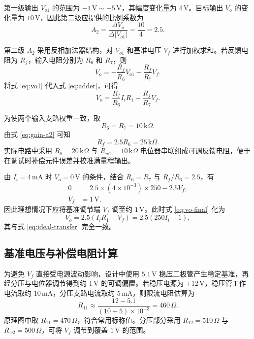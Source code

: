\documentclass[UTF8,a4paper,zihao=-4]{ctexart}
\begin{document}
第一级输出 $V_{o1}$ 的范围为 $-1\,\mathrm{V}\sim-5\,\mathrm{V}$，其幅度变化量为 $4\,\mathrm{V}$。目标输出 $V_o$ 的变化量为 $10\,\mathrm{V}$，因此第二级应提供的比例系数为
\begin{equation}
  A_2=\frac{\Delta V_o}{\Delta |V_{o1}|}
  =\frac{10}{4}=2.5 .
  \label{eq:gain-a2}
\end{equation}

第二级 $A_2$ 采用反相加法器结构，对 $V_{o1}$ 和基准电压 $V_f$ 进行加权求和。若反馈电阻为 $R_f$，输入电阻分别为 $R_6$ 和 $R_7$，则
\begin{equation}
  V_o=-\frac{R_f}{R_6}V_{o1}-\frac{R_f}{R_7}V_f .
  \label{eq:adder}
\end{equation}
将式 \eqref{eq:vo1} 代入式 \eqref{eq:adder}，可得
\begin{equation}
  V_o=\frac{R_f}{R_6}I_iR_1-\frac{R_f}{R_7}V_f .
  \label{eq:vo-final}
\end{equation}

为使两个输入支路权重一致，取
\begin{equation}
  R_6=R_7=10\,\mathrm{k}\Omega .
\end{equation}
由式 \eqref{eq:gain-a2} 可知
\begin{equation}
  R_f = 2.5R_6 = 25\,\mathrm{k}\Omega .
  \label{eq:rf}
\end{equation}
实际电路中采用 $R_8=20\,\mathrm{k}\Omega$ 与 $R_{w1}=10\,\mathrm{k}\Omega$ 电位器串联组成可调反馈电阻，便于在调试时补偿元件误差并校准满量程输出。

由 $I_i=4\,\mathrm{mA}$ 时 $V_o=0\,\mathrm{V}$ 的条件，结合 $R_6=R_7$ 与 $R_f/R_6=2.5$，有
\begin{align}
  0 &= 2.5 \times (4\times10^{-3}) \times 250 - 2.5 V_f,\\
  V_f &= 1\,\mathrm{V}.
  \label{eq:vf}
\end{align}
因此理想情况下应将基准调节端 $V_f$ 调至约 $1\,\mathrm{V}$。此时式 \eqref{eq:vo-final} 化为
\begin{equation}
  V_o=2.5\left(I_iR_1 - V_f\right)
  =2.5\left(250 I_i-1\right),
  \label{eq:transfer-designed}
\end{equation}
其与式 \eqref{eq:ideal-transfer} 完全一致。

\subsection{基准电压与补偿电阻计算}

为避免 $V_f$ 直接受电源波动影响，设计中使用 $5.1\,\mathrm{V}$ 稳压二极管产生稳定基准，再经分压与电位器调节得到约 $1\,\mathrm{V}$ 的可调偏置。若稳压电源为 $+12\,\mathrm{V}$，稳压管工作电流取约 $10\,\mathrm{mA}$，分压支路电流取约 $5\,\mathrm{mA}$，则限流电阻估算为
\begin{equation}
  R_{11}\approx
  \frac{12-5.1}{(10+5)\times10^{-3}}
  =460\,\Omega .
  \label{eq:r11}
\end{equation}
原理图中取 $R_{11}=470\,\Omega$，符合常用标称值。分压部分采用 $R_{12}=510\,\Omega$ 与 $R_{w2}=500\,\Omega$，可将 $V_f$ 调节到覆盖 $1\,\mathrm{V}$ 的范围。
\end{document}
